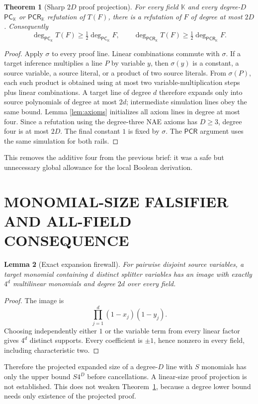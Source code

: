 \documentclass[11pt]{article}
\newtheorem{theorem}{Theorem}
\newtheorem{lemma}[theorem]{Lemma}
\newcommand{\PC}{\ensuremath{\mathsf{PC}}}
\newcommand{\PCR}{\ensuremath{\mathsf{PCR}}}
\begin{document}
\begin{theorem}[Sharp $2D$ proof projection]\label{thm:2d}
For every field $\mathbb K$ and every degree-$D$ \PC$_\mathbb K$ or
\PCR$_\mathbb K$ refutation of $T(F)$, there is a refutation of $F$ of degree
at most $2D$.  Consequently
\[
\deg_{\PC_\mathbb K} T(F)\ge
\tfrac12\deg_{\PC_\mathbb K}F,
\qquad
\deg_{\PCR_\mathbb K} T(F)\ge
\tfrac12\deg_{\PCR_\mathbb K}F.               \tag{7}
\]
\end{theorem}
\begin{proof}
Apply $\sigma$ to every proof line.  Linear combinations commute with
$\sigma$.  If a target inference multiplies a line $P$ by variable $y$, then
$\sigma(y)$ is a constant, a source variable, a source literal, or a product
of two source literals.  From $\sigma(P)$, each such product is obtained using
at most two variable-multiplication steps plus linear combinations.  A target
line of degree $d$ therefore expands only into source polynomials of degree at
most $2d$; intermediate simulation lines obey the same bound.  Lemma
\ref{lem:axioms} initializes all axiom lines in degree at most four.  Since a
refutation using the degree-three NAE axioms has $D\ge3$, degree four is at
most $2D$.  The final constant $1$ is fixed by $\sigma$.  The \PCR{} argument
uses the same simulation for both rails.
\end{proof}

This removes the additive four from the previous brief: it was a safe but
unnecessary global allowance for the local Boolean derivation.

\section{MONOMIAL-SIZE FALSIFIER AND ALL-FIELD CONSEQUENCE}
\begin{lemma}[Exact expansion firewall]
For pairwise disjoint source variables, a target monomial containing $d$
distinct splitter variables has an image with exactly $4^d$ multilinear
monomials and degree $2d$ over every field.
\end{lemma}
\begin{proof}
The image is
\[
\prod_{j=1}^d(1-x_j)(1-y_j).
\]
Choosing independently either $1$ or the variable term from every linear
factor gives $4^d$ distinct supports.  Every coefficient is $\pm1$, hence
nonzero in every field, including characteristic two.
\end{proof}

Therefore the projected expanded size of a degree-$D$ line with $S$ monomials
has only the upper bound $S4^D$ before cancellations.  A linear-size proof
projection is not established.  This does not weaken Theorem~\ref{thm:2d},
because a degree lower bound needs only existence of the projected proof.
\end{document}
